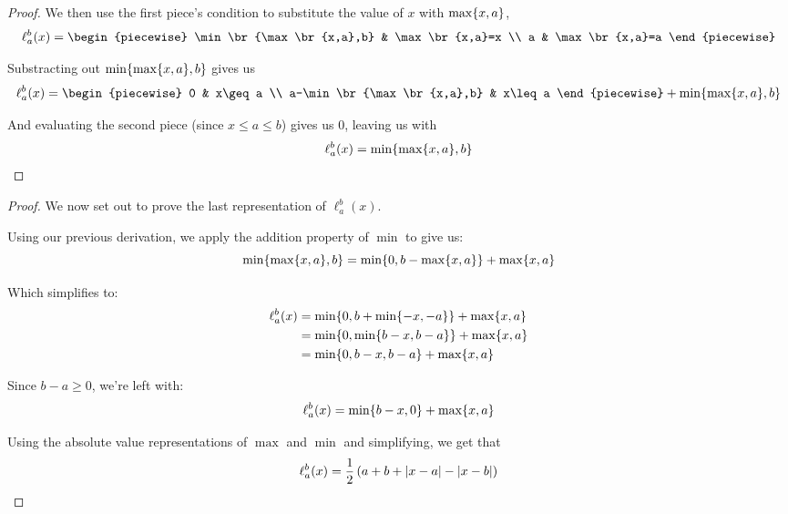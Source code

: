 \begin{theorem}
\begin{proof}
        We then use the first piece's condition to substitute the value of $x$ with $\max\{x,a\}$,
        $$
            \ell_{a}^{b}(x)=\begin{piecewise}
                \min\br{\max\br{x,a},b} & \max\br{x,a}=x \\
                a & \max\br{x,a}=a
            \end{piecewise}
        $$

        Substracting out $\min\{\max\{x,a\},b\}$ gives us
        $$
            \ell_{a}^{b}(x)=\begin{piecewise}
                0 & x\geq a \\
                a-\min\br{\max\br{x,a},b} & x\leq a
            \end{piecewise}+\min\br{\max\br{x,a},b}
        $$

        And evaluating the second piece (since $x\leq a\leq b$) gives us $0$, leaving us with
        $$
            \ell_{a}^{b}(x)=\min\{\max\{x,a\},b\}
        $$
    \end{proof}

    \begin{proof}
        We now set out to prove the last representation of $\ell_{a}^{b}(x)$.

        Using our previous derivation, we apply the addition property of $\min$ to give us:
        $$
            \min\{\max\{x,a\},b\}=\min\{0,b-\max\{x,a\}\}+\max\{x,a\}
        $$

        Which simplifies to:
        \begin{align*}
            \ell_{a}^{b}(x) &= \min\{0,b+\min\{-x,-a\}\}+\max\{x,a\} \\
                            &= \min\{0,\min\{b-x,b-a\}\}+\max\{x,a\} \\
                            &=\min\{0,b-x,b-a\}+\max\{x,a\}
        \end{align*}

        Since $b-a\geq 0$, we're left with:
        $$
            \ell_{a}^{b}(x)=\min\{b-x,0\}+\max\{x,a\}
        $$

        Using the absolute value representations of $\max$ and $\min$ and simplifying, we get that
        $$
            \ell_{a}^{b}(x)=\frac{1}{2}\left(a+b+\abs{x-a}-\abs{x-b}\right)
        $$
    \end{proof}
\end{theorem}

